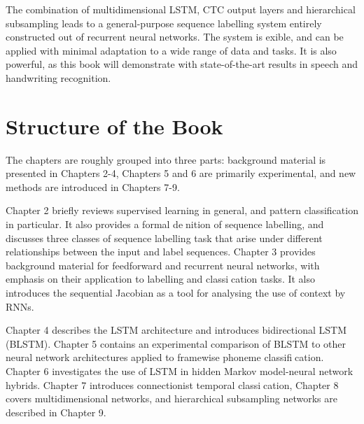 The combination of multidimensional LSTM, CTC output layers and hierarchical subsampling leads to a general-purpose sequence labelling system entirely constructed out of recurrent neural networks. The system is exible, and can be applied with minimal adaptation to a wide range of data and tasks. It is also powerful, as this book will demonstrate with state-of-the-art results in speech and handwriting recognition.

\section{Structure of the Book}
The chapters are roughly grouped into three parts: background material is presented in Chapters 2-4, Chapters 5 and 6 are primarily experimental, and new methods are introduced in Chapters 7-9.

Chapter 2 briefly reviews supervised learning in general, and pattern classification in particular. It also provides a formal denition of sequence labelling, and discusses three classes of sequence labelling task that arise under different relationships between the input and label sequences. Chapter 3 provides background material for feedforward and recurrent neural networks, with emphasis on their application to labelling and classication tasks. It also introduces the sequential Jacobian as a tool for analysing the use of context by RNNs.

Chapter 4 describes the LSTM architecture and introduces bidirectional LSTM (BLSTM). Chapter 5 contains an experimental comparison of BLSTM to other neural network architectures applied to framewise phoneme classification. Chapter 6 investigates the use of LSTM in hidden Markov model-neural network hybrids. Chapter 7 introduces connectionist temporal classication, Chapter 8 covers multidimensional networks, and hierarchical subsampling networks are described in Chapter 9.

